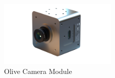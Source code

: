 \documentclass{article}
\begin{document}
\begin{figure}[H]
    \centering
    \includegraphics[width=0.5\textwidth]{img/olive-ai-camera-v2.20a7b87c.png}
    \caption[Olive Camera Module]{Olive Camera Module\footnotemark}
    \label{fig:Camera_Module}
\end{figure}

\end{document}
